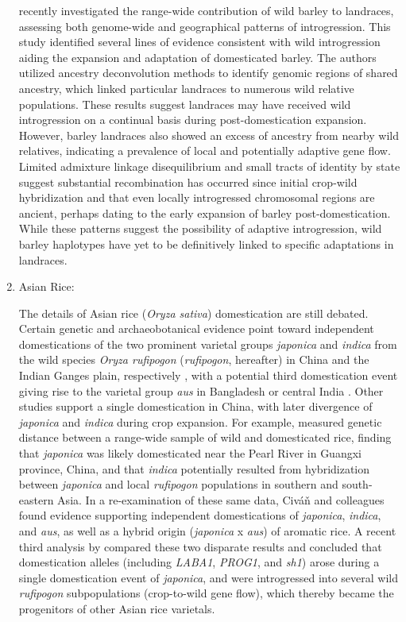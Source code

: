\documentclass[11pt]{article}
\begin{document}
\begin{enumerate}
\citet{Poets2015} recently investigated the range-wide contribution of wild barley to landraces, assessing both genome-wide and geographical patterns of introgression.
This study identified several lines of evidence consistent with wild introgression aiding the expansion and adaptation of domesticated barley.
The authors utilized ancestry deconvolution methods to identify genomic regions of shared ancestry, which linked particular landraces to numerous wild relative populations.
These results suggest landraces may have received wild introgression on a continual basis during post-domestication expansion.
However, barley landraces also showed an excess of ancestry from nearby wild relatives, indicating a prevalence of local and potentially adaptive gene flow.
Limited admixture linkage disequilibrium and small tracts of identity by state suggest substantial recombination has occurred since initial crop-wild hybridization and that even locally introgressed chromosomal regions are ancient, perhaps dating to the early expansion of barley post-domestication.
While these patterns suggest the possibility of adaptive introgression, wild barley haplotypes have yet to be definitively linked to specific adaptations in landraces.

\item{Asian Rice:}

The details of Asian rice (\emph{Oryza sativa}) domestication are still debated.
Certain genetic and archaeobotanical evidence point toward independent domestications of the two prominent varietal groups \emph{japonica} and \emph{indica} from the wild species \emph{Oryza rufipogon} (\emph{rufipogon}, hereafter) in China and the Indian Ganges plain, respectively \citep{fuller2010consilience}, with a potential third domestication event giving rise to the varietal group \emph{aus} in Bangladesh or central India \citep{civavn2015three}.
Other studies support a single domestication in China, with later divergence of \emph{japonica} and \emph{indica} \citep{molina2011molecular, Huang2012} during crop expansion.
For example, \citet{Huang2012} measured genetic distance between a range-wide sample of wild and domesticated rice, finding that \emph{japonica} was likely domesticated near the Pearl River in Guangxi province, China, and that \emph{indica} potentially resulted from hybridization between \emph{japonica} and local \emph{rufipogon} populations in southern and south-eastern Asia.
In a re-examination of these same data, Civ\'{a}\v{n} and colleagues \citeyearpar{civavn2015three} found evidence supporting independent domestications of \emph{japonica}, \emph{indica}, and \emph{aus}, as well as a hybrid origin (\emph{japonica} x \emph{aus}) of aromatic rice.
A recent third analysis by \citet{choi2018multiple} compared these two disparate results and concluded that domestication alleles (including \emph{LABA1}, \emph{PROG1}, and \emph{sh1}) arose during a single domestication event of \emph{japonica}, and were introgressed into several wild \emph{rufipogon} subpopulations (crop-to-wild gene flow), which thereby became the progenitors of other Asian rice varietals.


\end{enumerate}
\end{document}

